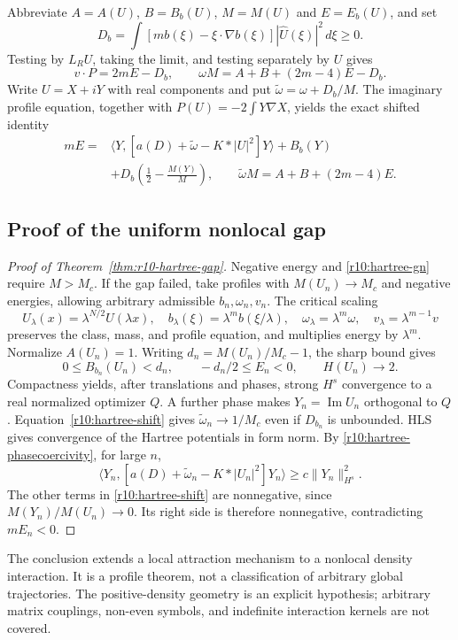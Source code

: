 Abbreviate $A=A(U)$, $B=B_b(U)$, $M=M(U)$ and $E=E_b(U)$, and set
\[
 D_b=\int[mb(\xi)-\xi\cdot\nabla b(\xi)]
                    |\widehat U(\xi)|^2\,d\xi\ge0.
\]
Testing by $L_RU$, taking the limit, and testing separately by $U$
gives
\begin{equation}\label{r10:hartree-identities}
 v\cdot P=2mE-D_b,
 \qquad \omega M=A+B+(2m-4)E-D_b.
\end{equation}
Write $U=X+iY$ with real components and put
$\widetilde\omega=\omega+D_b/M$.
The imaginary profile equation, together with
$P(U)=-2\int Y\nabla X$, yields the exact shifted identity
\begin{equation}\label{r10:hartree-shift}
 \begin{aligned}
 mE={}&\langle Y,[a(D)+\widetilde\omega-K*|U|^2]Y\rangle
       +B_b(Y)\\
     &+D_b\left(\frac12-\frac{M(Y)}M\right),\qquad
 \widetilde\omega M=A+B+(2m-4)E.
 \end{aligned}
\end{equation}

\subsection{Proof of the uniform nonlocal gap}

\begin{proof}[Proof of Theorem~\ref{thm:r10-hartree-gap}]
Negative energy and \eqref{r10:hartree-gn} require $M>M_c$.
If the gap failed, take profiles with $M(U_n)\to M_c$ and negative
energies, allowing arbitrary admissible $b_n,\omega_n,v_n$.
The critical scaling
\[
 U_\lambda(x)=\lambda^{N/2}U(\lambda x),\quad
 b_\lambda(\xi)=\lambda^m b(\xi/\lambda),\quad
 \omega_\lambda=\lambda^m\omega,\quad
 v_\lambda=\lambda^{m-1}v
\]
preserves the class, mass, and profile equation, and multiplies
energy by $\lambda^m$. Normalize $A(U_n)=1$.
Writing $d_n=M(U_n)/M_c-1$, the sharp bound gives
\[
 0\le B_{b_n}(U_n)<d_n,\qquad
 -d_n/2\le E_n<0,\qquad H(U_n)\longrightarrow2.
\]
Compactness yields, after translations and phases, strong
$H^s$ convergence to a real normalized optimizer $Q$.
A further phase makes $Y_n=\operatorname{Im}U_n$ orthogonal to $Q$.
Equation~\eqref{r10:hartree-shift} gives
$\widetilde\omega_n\to1/M_c$ even if $D_{b_n}$ is unbounded.
HLS gives convergence of the Hartree potentials in form norm.
By \eqref{r10:hartree-phasecoercivity}, for large $n$,
\[
 \langle Y_n,[a(D)+\widetilde\omega_n-K*|U_n|^2]Y_n\rangle
       \ge c\|Y_n\|_{H^s}^2.
\]
The other terms in \eqref{r10:hartree-shift} are nonnegative,
since $M(Y_n)/M(U_n)\to0$. Its right side is therefore
nonnegative, contradicting $mE_n<0$.
\end{proof}

The conclusion extends a local attraction mechanism to a nonlocal
density interaction. It is a profile theorem, not a classification
of arbitrary global trajectories. The positive-density geometry is
an explicit hypothesis; arbitrary matrix couplings, non-even
symbols, and indefinite interaction kernels are not covered.
